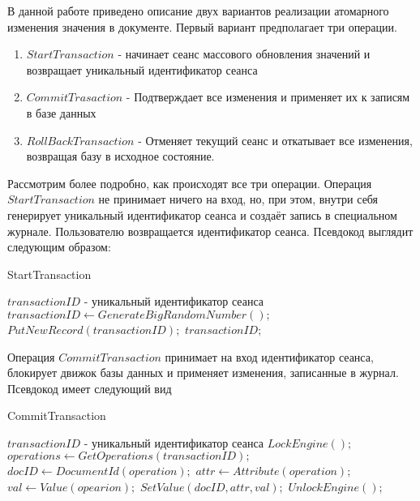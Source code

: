 \documentclass{matmex-diploma}
\begin{document}
        В данной работе приведено описание двух вариантов реализации атомарного изменения значения в документе. Первый вариант предполагает три операции.
        \begin{enumerate}
            \item $StartTransaction$ - начинает сеанс массового обновления значений и возвращает уникальный идентификатор сеанса 
            \item $CommitTrasaction$ - Подтверждает все изменения и применяет их к записям в базе данных
            \item $RollBackTransaction$ - Отменяет текущий сеанс и откатывает все изменения, возвращая базу в исходное состояние.
        \end{enumerate}    
        Рассмотрим более подробно, как происходят все три операции. Операция $StartTransaction$ не принимает ничего на вход, но, при этом, внутри себя генерирует уникальный идентификатор сеанса и создаёт запись в специальном журнале. Пользователю возвращается идентификатор сеанса. Псевдокод выглядит следующим образом:
            
        \begin{algorithm}[H]                   
        \caption{StartTransaction}              
        \label{startTran1}                        
            \begin{algorithmic}        
                \ENSURE $transactionID$ - уникальный идентификатор сеанса
                \STATE $transactionID \leftarrow GenerateBigRandomNumber();$
                \STATE $PutNewRecord(transactionID);$
                \RETURN $transactionID;$
            \end{algorithmic}
        \end{algorithm}
        
        Операция $CommitTransaction$ принимает на вход идентификатор сеанса, блокирует движок базы данных и применяет изменения, записанные в журнал. Псевдокод имеет следующий вид
        
        \begin{algorithm}[H]                   
        \caption{CommitTransaction}              
        \label{commitTran1}                        
            \begin{algorithmic}
                \REQUIRE $transactionID$ - уникальный идентификатор сеанса
                \STATE $LockEngine();$
                \STATE $ operations \leftarrow GetOperations(transactionID);$
                    \STATE $docID \leftarrow DocumentId(operation);$
                    \STATE $attr \leftarrow Attribute(operation);$
                    \STATE $val \leftarrow Value(opearion);$
                    \STATE $SetValue(docID, attr, val);$
                \ENDFOR
                \STATE $UnlockEngine();$
            \end{algorithmic}
        \end{algorithm}
        
\end{document}
